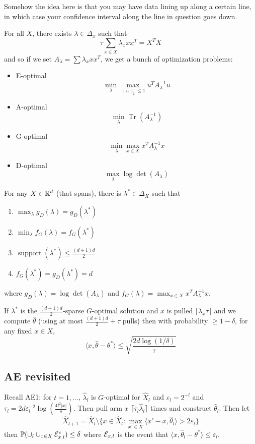 \documentclass[12pt]{article}
\begin{document}
Somehow the idea here is that you may have data lining up along a certain line, in which case your confidence interval along the line in question goes down.

\brk

For all $X$, there exists $\lambda\in\Delta_x$ such that 
\[\tau\sum_{x\in X}\lambda_x xx^T=X^TX\]
and so if we set $A_\lambda=\sum \lambda_xxx^T$, we get a bunch of optimization problems:
\begin{itemize}
	\item E-optimal
	\[\min_\lambda\max_{\|u\|_2\le 1}u^TA^{-1}_\lambda u\]
	\item A-optimal
	\[\min_\lambda\operatorname{Tr}(A_\lambda^{-1})\]
	\item G-optimal
	\[\min_\lambda\max_{x\in X}x^TA^{-1}_\lambda x\]
	\item D-optimal
	\[\max_{\lambda}\log\det(A_\lambda)\]
\end{itemize}
\begin{thm}
	For any $X\in\mathbb{R}^d$ (that spans), there is $\lambda^\ast\in\Delta_X$ such that 
	\begin{enumerate}
		\item $\max_\lambda g_D(\lambda)=g_D(\lambda^\ast)$
		\item $\min_\lambda f_G(\lambda)=f_G(\lambda^\ast)$
		\item $\operatorname{support}(\lambda^\ast)\le\frac{(d+1)d}{2}$
		\item $f_G(\lambda^\ast)=g_D(\lambda^\ast)=d$
	\end{enumerate}
	where $g_D(\lambda)=\log\det(A_\lambda)$ and $f_G(\lambda)=\max_{x\in X}x^TA_\lambda^{-1}x.$
\end{thm}

\begin{prop}
	If $\lambda^\ast$ is the $\frac{(d+1)d}2$-sparse $G$-optimal solution and $x$ is pulled $\lceil\lambda_x\tau\rceil$ and we compute $\hat\theta$ (using at most $\frac{(d+1)d}{2}+\tau$ pulls)
	then with probability $\ge 1-\delta$, for any fixed $x\in X$,
	\[\langle x,\hat\theta-\theta^\ast\rangle\le\sqrt{\frac{2d\log(1/\delta)}{\tau}}\]
\end{prop}

\subsection{AE revisited}
Recall AE1: for $t=1,\dots$, $\hat\lambda_l$ is $G$-optimal for $\hat X_l$ and $\varepsilon_l=2^{-l}$ and $\tau_l=2d\varepsilon_l^{-2}\log\left(\frac{4l^2|x|}{\delta}\right).$
Then pull arm $x$ $\lceil\tau_l\hat\lambda_l\rceil$ times and construct $\hat\theta_l$. Then let 
\[\hat X_{l+1}=\hat X_l\setminus\{x\in\hat X_l:\max_{x'\in X}\langle x'-x,\hat\theta_l\rangle>2\varepsilon_l\}\]
then $\mathbb{P}(\cup_l\cup_{x\in X}\mathcal{E}_{x,l}^c)\le\delta$ where $\mathcal{E}_{x,l}$ is the event that $\langle x,\hat\theta_l-\theta^\ast\rangle\le\varepsilon_l.$
\end{document}
